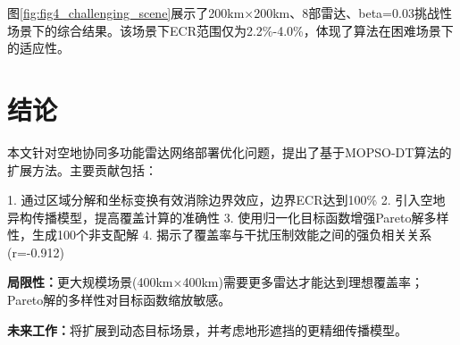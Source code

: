 图\ref{fig:fig4_challenging_scene}展示了200km×200km、8部雷达、beta=0.03挑战性场景下的综合结果。该场景下ECR范围仅为2.2\%-4.0\%，体现了算法在困难场景下的适应性。

\section{结论}
\label{sec:conclusion}

本文针对空地协同多功能雷达网络部署优化问题，提出了基于MOPSO-DT算法的扩展方法。主要贡献包括：

1. 通过区域分解和坐标变换有效消除边界效应，边界ECR达到100\%
2. 引入空地异构传播模型，提高覆盖计算的准确性
3. 使用归一化目标函数增强Pareto解多样性，生成100个非支配解
4. 揭示了覆盖率与干扰压制效能之间的强负相关关系(r=-0.912)

\textbf{局限性：}更大规模场景(400km×400km)需要更多雷达才能达到理想覆盖率；Pareto解的多样性对目标函数缩放敏感。

\textbf{未来工作：}将扩展到动态目标场景，并考虑地形遮挡的更精细传播模型。